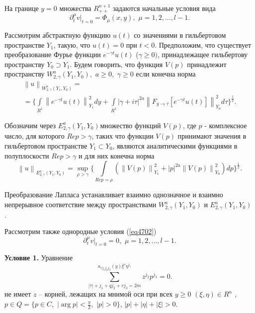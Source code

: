 На границе $y = 0$ множества $R_{ + + }^{n + 1} $ задаются начальные условия
вида
\begin{equation}
\label{eq4702}
\partial _t^\mu \left. v \right|_{t = 0} = \Phi _\mu (x,y),\,\,\mu =
1,2,...,l - 1.
\end{equation}



Рассмотрим абстрактную функцию $u(t)$ со значениями в ги\-ль\-бе\-р\-то\-вом
пространстве $Y_1 $, такую, что $u(t) = 0$ при $t < 0$. Предположим, что
существует преобразование Фурье функции $e^{ - \gamma t}u(t)$ ($\gamma \geqslant
0)$, принадлежащее гильбертову пространству $Y_0 \supset Y_1 $. Будем
говорить, что функция $V(p)$ принадлежит пространству $W_{2,\gamma }^a (Y_1
,Y_0 ),\,\,a \geqslant 0,\,\,\gamma \geqslant 0$ если конечна норма
\begin{multline*}
\left\| u \right\|_{W_{2,\gamma }^a (Y_1 ,Y_0 )} =
\\=
\{\int\limits_{R^1}
{\left\| {e^{ - \gamma t}u(t)} \right\|_{Y_1 }^2 dy} + \int\limits_{R^1}
{\left| {\gamma + i\tau } \right|^{2a}\left\| {F_{y \to \tau } [e^{ - \gamma
t}u(t)]} \right\|_{Y_0 }^2 d\tau \}^{\frac{1}{2}}} .
\end{multline*}



Обозначим через $E_{2,\gamma }^a (Y_1 ,Y_0 )_{ }$множество функций $V(p)$,
где $p$ - комплексное число, для которого $Rep > \gamma $, таких что функции
$V(p)$ принимают значения в гильбертовом пространстве $Y_1 \subset Y_0 $,
являются аналитическими функциями в полуплоскости $Rep > \gamma $ и для них
конечна норма
\[
\left\| u \right\|_{E_{2,\gamma }^a (Y_1 ,Y_0 )} = \mathop {\sup
}\limits_{\rho > \gamma } \{\int\limits_{Rep = \rho } {(\left\| {V(p)}
\right\|_{Y_1 }^2 + \left| p \right|^{2a}\left\| {V(p)} \right\|_{Y_0 }^2
)dp} \}^{\frac{1}{2}}.
\]

Преобразование Лапласа устанавливает взаимно однозначное и взаимно
непрерывное соответствие между пространствами $W_{2,\gamma }^a (Y_1 ,Y_0 )$
и $E_{2,\gamma }^a (Y_1 ,Y_0 )$ .

Рассмотрим также однородные условия (\ref{eq4702})
\begin{equation}
\label{eq4703}
\partial _t^\mu \left. v \right|_{t = 0} = 0,\,\,\mu = 1,2,...,l - 1.
\end{equation}



\textbf{Условие 1.} Уравнение
\begin{equation}
\label{eq4704}
\sum\limits_{\left| \tau \right| + j_1 + qj_2 + rj_3 = 2m}^ {a_{\tau j_1 j_2
j_3 } (y)\xi ^\tau \eta ^{j_1 }} z^{j_2 }p^{j_3 } = 0.
\end{equation}
не имеет $z$ -- корней, лежащих на мнимой оси при всех $y \geqslant 0\,\,(\xi
,\eta ) \in R^n\,\,$, $p \in Q = \{p \in C,\,\,\left| {\arg p} \right| <
\frac{\pi }{2},\,\,\left| p \right| > 0\}$, $\left| p \right| + \left| \eta
\right| + \left| \xi \right| > 0$.

